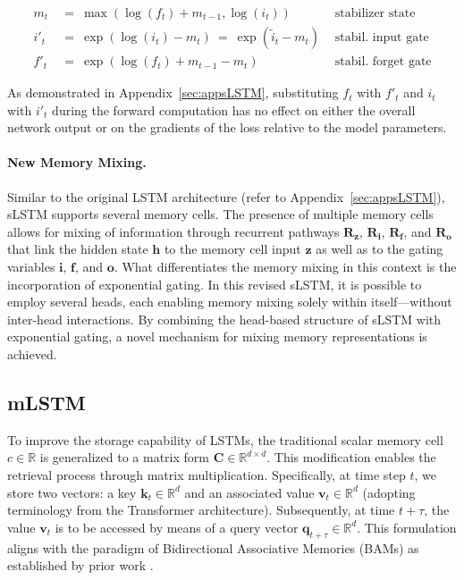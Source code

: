 \begin{align}
\label{eq:slstmstabil}
m_t \ &= \ \max \left( \log ( f_t ) + m_{t-1} , \log ( i_t ) \right) &\text{stabilizer state} \\
i'_t \ &= \ \!\exp \left( \log \left ( i_t \right) - m_t \right) \ = \ \!\exp \left( \tilde{i}_t - m_t \right) \ \, 
  &\text{stabil. input gate} \\
f'_t \ &= \ \!\exp \left( \log \left( f_t \right) + m_{t-1} - m_t \right) \ \, 
  &\text{stabil. forget gate}
\end{align}

As demonstrated in Appendix~\ref{sec:appsLSTM}, substituting $f_t$ with $f'_t$ and $i_t$ with $i'_t$ during the forward computation has no effect on either the overall network output or on the gradients of the loss relative to the model parameters.

\paragraph{New Memory Mixing.} Similar to the original LSTM architecture (refer to Appendix~\ref{sec:appsLSTM}), sLSTM supports several memory cells. The presence of multiple memory cells allows for mixing of information through recurrent pathways $\mathbf{R}_{\mathbf{z}}$, $\mathbf{R}_{\mathbf{i}}$, $\mathbf{R}_{\mathbf{f}}$, and $\mathbf{R}_{\mathbf{o}}$ that link the hidden state $\mathbf{h}$ to the memory cell input $\mathbf{z}$ as well as to the gating variables $\mathbf{i}$, $\mathbf{f}$, and $\mathbf{o}$. What differentiates the memory mixing in this context is the incorporation of exponential gating. In this revised sLSTM, it is possible to employ several heads, each enabling memory mixing solely within itself—without inter-head interactions. By combining the head-based structure of sLSTM with exponential gating, a novel mechanism for mixing memory representations is achieved.

\subsection{mLSTM}
\label{sec:mLSTM}

To improve the storage capability of LSTMs, the traditional scalar memory cell $c \in \mathbb{R}$ is generalized to a matrix form $\mathbf{C} \in \mathbb{R}^{d \times d}$. This modification enables the retrieval process through matrix multiplication. Specifically, at time step $t$, we store two vectors: a key $\mathbf{k}_t \in \mathbb{R}^d$ and an associated value $\mathbf{v}_t \in \mathbb{R}^d$ (adopting terminology from the Transformer architecture). Subsequently, at time $t + \tau$, the value $\mathbf{v}_t$ is to be accessed by means of a query vector $\mathbf{q}_{t+\tau} \in \mathbb{R}^d$. This formulation aligns with the paradigm of Bidirectional Associative Memories (BAMs) as established by prior work \citep{Kohonen:72,Anderson:72,Nakano:72,Anderson:77}.

